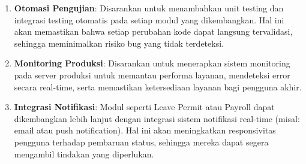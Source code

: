 \begin{enumerate}
	\item \textbf{Otomasi Pengujian}: Disarankan untuk menambahkan unit testing dan integrasi testing otomatis pada setiap modul yang dikembangkan. Hal ini akan memastikan bahwa setiap perubahan kode dapat langsung tervalidasi, sehingga meminimalkan risiko bug yang tidak terdeteksi.
	\item \textbf{Monitoring Produksi}: Disarankan untuk menerapkan sistem monitoring pada server produksi untuk memantau performa layanan, mendeteksi error secara real-time, serta memastikan ketersediaan layanan bagi pengguna akhir.
	\item \textbf{Integrasi Notifikasi}: Modul seperti Leave Permit atau Payroll dapat dikembangkan lebih lanjut dengan integrasi sistem notifikasi real-time (misal: email atau push notification). Hal ini akan meningkatkan responsivitas pengguna terhadap pembaruan status, sehingga mereka dapat segera mengambil tindakan yang diperlukan.
\end{enumerate}